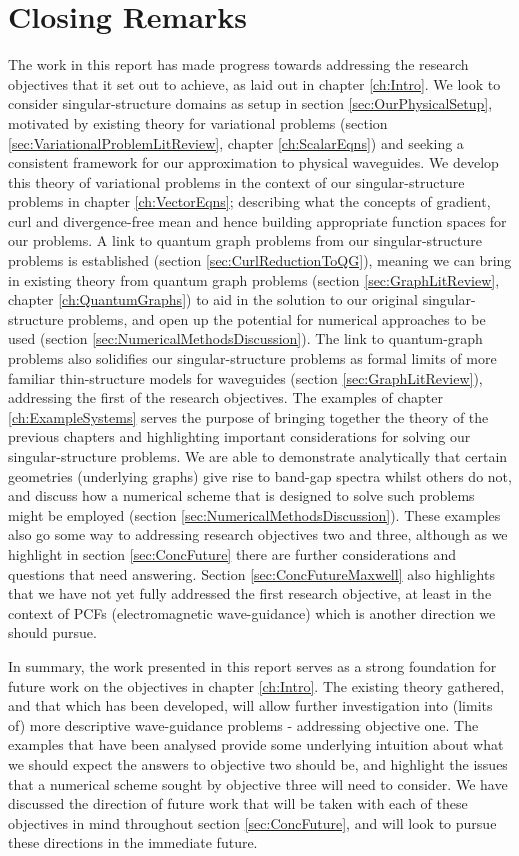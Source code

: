 \section{Closing Remarks} \label{sec:ConcClosingRemarks}
The work in this report has made progress towards addressing the research objectives that it set out to achieve, as laid out in chapter \ref{ch:Intro}.
We look to consider singular-structure domains as setup in section \ref{sec:OurPhysicalSetup}, motivated by existing theory for variational problems (section \ref{sec:VariationalProblemLitReview}, chapter \ref{ch:ScalarEqns}) and seeking a consistent framework for our approximation to physical waveguides.
We develop this theory of variational problems in the context of our singular-structure problems in chapter \ref{ch:VectorEqns}; describing what the concepts of gradient, curl and divergence-free mean and hence building appropriate function spaces for our problems.
A link to quantum graph problems from our singular-structure problems is established (section \ref{sec:CurlReductionToQG}), meaning we can bring in existing theory from quantum graph problems (section \ref{sec:GraphLitReview}, chapter \ref{ch:QuantumGraphs}) to aid in the solution to our original singular-structure problems, and open up the potential for numerical approaches to be used (section \ref{sec:NumericalMethodsDiscussion}).
The link to quantum-graph problems also solidifies our singular-structure problems as formal limits of more familiar thin-structure models for waveguides (section \ref{sec:GraphLitReview}), addressing the first of the research objectives.
The examples of chapter \ref{ch:ExampleSystems} serves the purpose of bringing together the theory of the previous chapters and highlighting important considerations for solving our singular-structure problems.
We are able to demonstrate analytically that certain geometries (underlying graphs) give rise to band-gap spectra whilst others do not, and discuss how a numerical scheme that is designed to solve such problems might be employed (section \ref{sec:NumericalMethodsDiscussion}).
These examples also go some way to addressing research objectives two and three, although as we highlight in section \ref{sec:ConcFuture} there are further considerations and questions that need answering.
Section \ref{sec:ConcFutureMaxwell} also highlights that we have not yet fully addressed the first research objective, at least in the context of PCFs (electromagnetic wave-guidance) which is another direction we should pursue. \newline

In summary, the work presented in this report serves as a strong foundation for future work on the objectives in chapter \ref{ch:Intro}.
The existing theory gathered, and that which has been developed, will allow further investigation into (limits of) more descriptive wave-guidance problems - addressing objective one.
The examples that have been analysed provide some underlying intuition about what we should expect the answers to objective two should be, and highlight the issues that a numerical scheme sought by objective three will need to consider.
We have discussed the direction of future work that will be taken with each of these objectives in mind throughout section \ref{sec:ConcFuture}, and will look to pursue these directions in the immediate future.